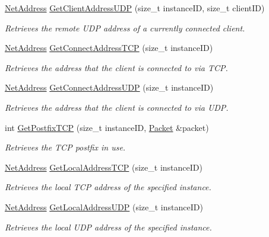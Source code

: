 \begin{DoxyCompactItemize}
\hyperlink{class_net_address}{NetAddress} \hyperlink{namespacemn_ae287dc45367896e319d1514aefe3c87f}{GetClientAddressUDP} (size\_\-t instanceID, size\_\-t clientID)
\begin{DoxyCompactList}\small\item\em Retrieves the remote UDP address of a currently connected client. \item\end{DoxyCompactList}\item 
\hyperlink{class_net_address}{NetAddress} \hyperlink{namespacemn_a539cbc714e7b5a1ea1f19bca9b9b2ba1}{GetConnectAddressTCP} (size\_\-t instanceID)
\begin{DoxyCompactList}\small\item\em Retrieves the address that the client is connected to via TCP. \item\end{DoxyCompactList}\item 
\hyperlink{class_net_address}{NetAddress} \hyperlink{namespacemn_a21d78dd4a2693e3924f71f148319a5bd}{GetConnectAddressUDP} (size\_\-t instanceID)
\begin{DoxyCompactList}\small\item\em Retrieves the address that the client is connected to via UDP. \item\end{DoxyCompactList}\item 
int \hyperlink{namespacemn_a7fbec55bb4f503c2afdd1aa48cbd141e}{GetPostfixTCP} (size\_\-t instanceID, \hyperlink{class_packet}{Packet} \&packet)
\begin{DoxyCompactList}\small\item\em Retrieves the TCP postfix in use. \item\end{DoxyCompactList}\item 
\hyperlink{class_net_address}{NetAddress} \hyperlink{namespacemn_a9607086d552b4334905d2db5c1256cce}{GetLocalAddressTCP} (size\_\-t instanceID)
\begin{DoxyCompactList}\small\item\em Retrieves the local TCP address of the specified instance. \item\end{DoxyCompactList}\item 
\hyperlink{class_net_address}{NetAddress} \hyperlink{namespacemn_a3079e11eb9cbd6f70b8d9c756f33b01b}{GetLocalAddressUDP} (size\_\-t instanceID)
\begin{DoxyCompactList}\small\item\em Retrieves the local UDP address of the specified instance. \item\end{DoxyCompactList}\item 

\end{DoxyCompactItemize}
